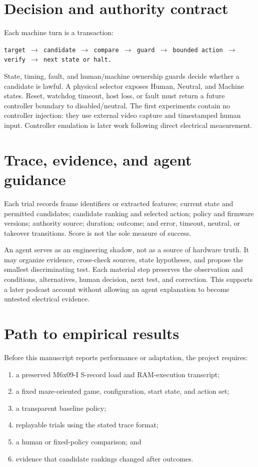 \documentclass[11pt]{article}
\begin{document}
\section{Decision and authority contract}

Each machine turn is a transaction:

\begin{center}
\texttt{target $\rightarrow$ candidate $\rightarrow$ compare $\rightarrow$ guard
$\rightarrow$ bounded action $\rightarrow$ verify $\rightarrow$ next state or halt.}
\end{center}

State, timing, fault, and human/machine ownership guards decide whether a
candidate is lawful. A physical selector exposes Human, Neutral, and Machine
states. Reset, watchdog timeout, host loss, or fault must return a future
controller boundary to disabled/neutral. The first experiments contain no
controller injection: they use external video capture and timestamped human
input. Controller emulation is later work following direct electrical
measurement.

\section{Trace, evidence, and agent guidance}

Each trial records frame identifiers or extracted features; current state and
permitted candidates; candidate ranking and selected action; policy and
firmware versions; authority source; duration; outcome; and error, timeout,
neutral, or takeover transitions. Score is not the sole measure of success.

An agent serves as an engineering shadow, not as a source of hardware truth. It
may organize evidence, cross-check sources, state hypotheses, and propose the
smallest discriminating test. Each material step preserves the observation and
conditions, alternatives, human decision, next test, and correction. This
supports a later podcast account without allowing an agent explanation to become
untested electrical evidence.

\section{Path to empirical results}

Before this manuscript reports performance or adaptation, the project requires:

\begin{enumerate}[leftmargin=1.5em]
\item a preserved M6x09-I S-record load and RAM-execution transcript;
\item a fixed maze-oriented game, configuration, start state, and action set;
\item a transparent baseline policy;
\item replayable trials using the stated trace format;
\item a human or fixed-policy comparison; and
\item evidence that candidate rankings changed after outcomes.
\end{enumerate}
\end{document}
